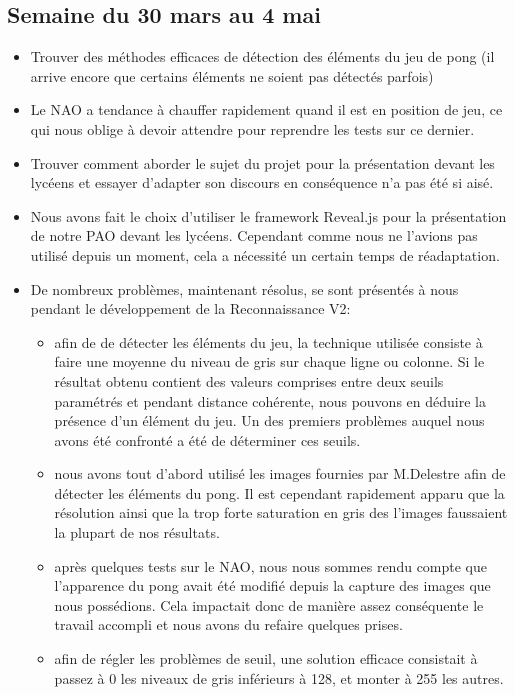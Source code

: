   \subsection{Semaine du 30 mars au 4 mai}
  \label{sub:Semaine du 30 mars au 4 mai}
    \begin{itemize}
      \item Trouver des méthodes efficaces de détection des éléments du jeu de pong (il arrive encore que certains éléments ne soient pas détectés parfois)
      \item Le NAO a tendance à chauffer rapidement quand il est en position de jeu, ce qui nous oblige à devoir attendre pour reprendre les tests sur ce dernier.
      \item Trouver comment aborder le sujet du projet pour la présentation devant les lycéens et essayer d’adapter son discours en conséquence n’a pas été si aisé.
      \item Nous avons fait le choix d’utiliser le framework Reveal.js pour la présentation de notre PAO devant les lycéens.
      Cependant comme nous ne l’avions pas utilisé depuis un moment, cela a nécessité un certain temps de réadaptation.
      \item De nombreux problèmes, maintenant résolus, se sont présentés à nous pendant le développement de la Reconnaissance V2:
            \begin{itemize}
              \item afin de de détecter les éléments du jeu, la technique utilisée consiste à faire une moyenne du niveau de gris sur chaque ligne ou colonne.
              Si le résultat obtenu contient des valeurs comprises entre deux seuils paramétrés et pendant distance cohérente, nous pouvons en déduire la présence d’un élément du jeu.
              Un des premiers problèmes auquel nous avons été confronté a été de déterminer ces seuils.
              \item nous avons tout d’abord utilisé les images fournies par M.Delestre afin de détecter les éléments du pong.
              Il est cependant rapidement apparu que la résolution ainsi que la trop forte saturation en gris des l’images faussaient la plupart de nos résultats.
              \item après quelques tests sur le NAO, nous nous sommes rendu compte que l’apparence du pong avait été modifié depuis la capture des images que nous possédions.
              Cela impactait donc de manière assez conséquente le travail accompli et nous avons du refaire quelques prises.
              \item afin de régler les problèmes de seuil, une solution efficace consistait à passez à 0 les niveaux de gris inférieurs à 128, et monter à 255 les autres.

\end{itemize}
\end{itemize}
